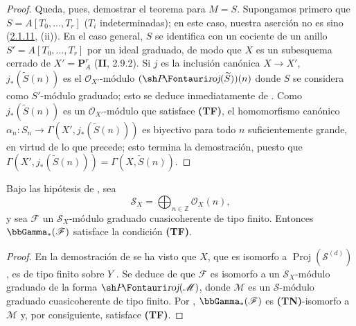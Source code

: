 \begin{proof}
Queda, pues, demostrar el teorema para $M=S$.
Supongamos primero que
$S=A[T_0,\ldots,T_r]$ ($T_i$ indeterminadas); en este caso, nuestra aserción no es sino (\hyperref[III.2.1.11-fr]{2.1.11}, (ii)). En el caso general, $S$ se identifica con un cociente de un anillo
$S'=A[T_0,\ldots,T_r]$
por un ideal graduado, de modo que $X$ es un subesquema cerrado de
$X'=\mathbf P_A^r$ (\textbf{II}, 2.9.2). Si $j$ es la inclusión canónica
$X\to X'$, $j_*(\widetilde S(n))$ es el $\mathcal O_{X'}$-módulo
$(\shProj(\widetilde S))(n)$
donde $S$ se considera como $S'$-módulo graduado; esto se deduce inmediatamente de .
Como $j_*(\widetilde S(n))$ es un $\mathcal O_{X'}$-módulo que satisface \textbf{(TF)}, el homomorfismo canónico
$\alpha_n:S_n\to\Gamma(X',j_*(\widetilde S(n)))$
es biyectivo para todo $n$ suficientemente grande, en virtud de lo que precede; esto termina la demostración, puesto que $\Gamma(X',j_*(\widetilde S(n)))=\Gamma(X,\widetilde S(n))$.
\end{proof}

\begin{corollary}[2.3.2]
\label{III.2.3.2}
\label{III.2.3.2-fr}
Bajo las hipótesis de \textup{}, sea
\[
\mathcal S_X=\bigoplus_{n\in\mathbb Z}\mathcal O_X(n),
\]
y sea $\mathcal F$ un $\mathcal S_X$-módulo graduado cuasicoherente de tipo finito.
Entonces $\bbGamma_*(\mathcal F)$ satisface la condición \textup{\textbf{(TF)}}.
\end{corollary}

\begin{proof}
En la demostración de  se ha visto que $X$, que es isomorfo a $\operatorname{Proj}(\mathcal S^{(d)})$ , es de tipo finito sobre $Y$ .
Se deduce de  que $\mathcal F$ es isomorfo a un $\mathcal S_X$-módulo graduado de la forma $\shProj(\mathcal M)$, donde $\mathcal M$ es un $\mathcal S$-módulo graduado cuasicoherente de tipo finito.
Por , $\bbGamma_*(\mathcal F)$ es \textbf{(TN)}-isomorfo a $\mathcal M$ y, por consiguiente, satisface \textbf{(TF)}.
\end{proof}

